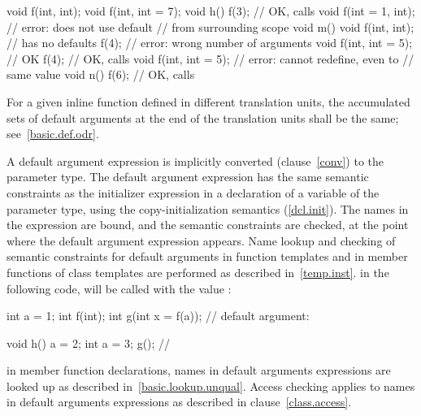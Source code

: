 \begin{codeblock}
void f(int, int);
void f(int, int = 7);
void h()
{
    f(3);                       // OK, calls 
    void f(int = 1, int);       // error: does not use default
                                // from surrounding scope
}
void m()
{
    void f(int, int);           // has no defaults
    f(4);                       // error: wrong number of arguments
    void f(int, int = 5);       // OK
    f(4);                       // OK, calls 
    void f(int, int = 5);       // error: cannot redefine, even to
                                // same value
}
void n()
{
    f(6);                       // OK, calls 
}
\end{codeblock}
\exitexampleb
For a given inline function defined in different translation units,
the accumulated sets of default arguments at the end of the
translation units shall be the same;
see~\ref{basic.def.odr}.

\pnum
{}%
%
%
A default argument expression is implicitly converted (clause~\ref{conv})
to the parameter type.
The default argument expression has the
same semantic constraints as the initializer expression in a
declaration of a variable of the parameter type, using the
copy-initialization semantics (\ref{dcl.init}).
The names in the expression
are bound, and the semantic constraints are checked,
at the point where the default argument expression appears.
Name lookup and checking of semantic constraints for default
arguments in function templates and in member functions of
class templates are performed as described in~\ref{temp.inst}.
\enterexample
in the following code,
%
will be called with the value
:

\begin{codeblock}
int a = 1;
int f(int);
int g(int x = f(a));            // default argument: 

void h() {
    a = 2;
    {
	int a = 3;
	g();                    // 
    }
}
\end{codeblock}
\exitexampleb
\enternote
in member function declarations,
names in default arguments expressions are looked up
as described in~\ref{basic.lookup.unqual}.
Access checking applies to names in default arguments expressions as
described in clause~\ref{class.access}.
\exitnote

